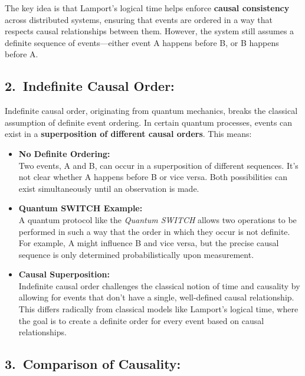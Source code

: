 \documentclass[../../../OAE-SPEC-MAIN.tex]{subfiles}
\begin{document}
The key idea is that Lamport’s logical time helps enforce \textbf{causal consistency} across distributed systems, ensuring that events are ordered in a way that respects causal relationships between them. However, the system still assumes a definite sequence of events—either event A happens before B, or B happens before A.

\subsection*{2.\ Indefinite Causal Order:}

Indefinite causal order, originating from quantum mechanics, breaks the classical assumption of definite event ordering. In certain quantum processes, events can exist in a \textbf{superposition of different causal orders}. This means:

\begin{itemize}[leftmargin=1.5em]
\item \textbf{No Definite Ordering:}\\
  Two events, A and B, can occur in a superposition of different sequences. It's not clear whether A happens before B or vice versa. Both possibilities can exist simultaneously until an observation is made.
\item \textbf{Quantum SWITCH Example:}\\
  A quantum protocol like the \emph{Quantum SWITCH} allows two operations to be performed in such a way that the order in which they occur is not definite. For example, A might influence B and vice versa, but the precise causal sequence is only determined probabilistically upon measurement.
\item \textbf{Causal Superposition:}\\
  Indefinite causal order challenges the classical notion of time and causality by allowing for events that don't have a single, well-defined causal relationship. This differs radically from classical models like Lamport’s logical time, where the goal is to create a definite order for every event based on causal relationships.
\end{itemize}

\subsection*{3.\ Comparison of Causality:}
\end{document}
